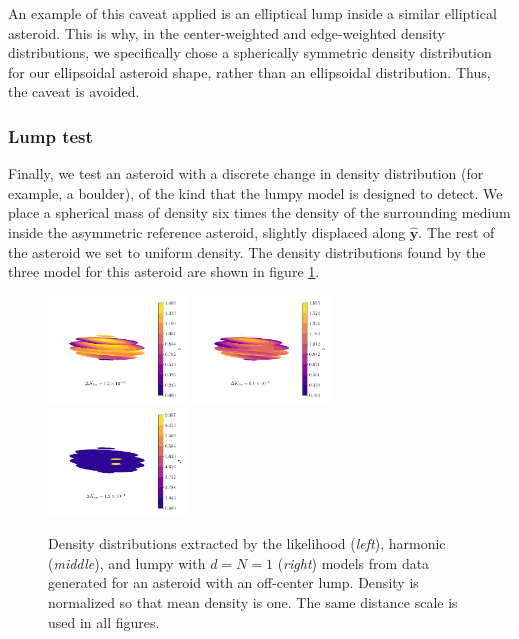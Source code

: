 \documentclass[fleqn,usenatbib]{mnras}
\newcommand{\unit}[1]{\bm{\hat{#1}}}
\begin{document}
An example of this caveat applied is an elliptical lump inside a similar elliptical asteroid. This is why, in the center-weighted and edge-weighted density distributions, we specifically chose a spherically symmetric density distribution for our ellipsoidal asteroid shape, rather than an ellipsoidal distribution. Thus, the caveat is avoided.



\subsubsection{Lump test}

Finally, we test an asteroid with a discrete change in density distribution (for example, a boulder), of the kind that the lumpy model is designed to detect. We place a spherical mass of density six times the density of the surrounding medium inside the asymmetric reference asteroid, slightly displaced along $\unit y$. The rest of the asteroid we set to uniform density. The density distributions found by the three model for this asteroid are shown in figure \ref{fig:blob-density}.

\begin{figure}
  \centering
  \includegraphics[width=0.33\textwidth]{figs/blob-likelihood.pdf}\hfill
  \includegraphics[width=0.33\textwidth]{figs/blob-harmonic.pdf}\hfill
  \includegraphics[width=0.33\textwidth]{figs/blob-lumpy.pdf}

  \caption{Density distributions extracted by the likelihood (\textit{left}), harmonic (\textit{middle}), and lumpy with $d=N=1$ (\textit{right}) models from data generated for an asteroid with an off-center lump. Density is normalized so that mean density is one. The same distance scale is used in all figures.}
  \label{fig:blob-density}
\end{figure}
\end{document}
